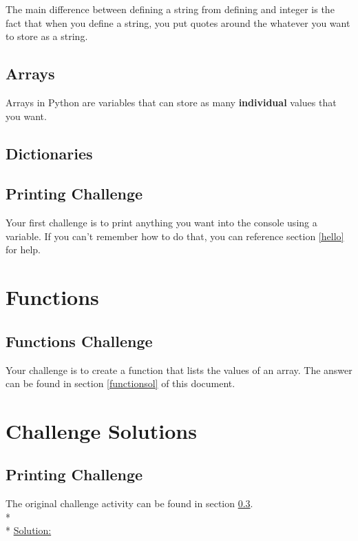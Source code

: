 \documentclass[12pt, letterpaper]{article}
\begin{document}
    The main difference between defining a string from defining and integer is the fact that when you define a string, you put quotes around the whatever you want to store as a string.

    \subsection{Arrays} \label{arrays}

    Arrays in Python are variables that can store as many \textbf{individual} values that you want.
    
    \subsection{Dictionaries} \label{dictionaries}

    \subsection{Printing Challenge} \label{hellochallenge}
    
    Your first challenge is to print anything you want into the console using a variable. If you can't remember how to do that, you can reference section \ref{hello} for help.

    \section{Functions} \label{functions}

    \subsection{Functions Challenge} \label{functionschallenge}

    Your challenge is to create a function that lists the values of an array. The answer can be found in section \ref{functionsol} of this document.

    
    \section{Challenge Solutions} \label{solutions}

    \subsection{Printing Challenge} \label{hellosol}
    The original challenge activity can be found in section \ref{hellochallenge}. \\*\\*
    \underline{Solution:}
\end{document}
